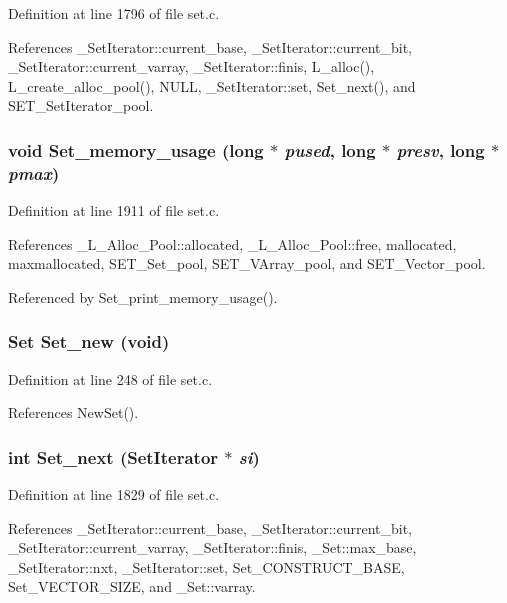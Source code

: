 Definition at line 1796 of file set.c.

References \_\-Set\-Iterator::current\_\-base, \_\-Set\-Iterator::current\_\-bit, \_\-Set\-Iterator::current\_\-varray, \_\-Set\-Iterator::finis, L\_\-alloc(), L\_\-create\_\-alloc\_\-pool(), NULL, \_\-Set\-Iterator::set, Set\_\-next(), and SET\_\-Set\-Iterator\_\-pool.
\subsubsection{\setlength{\rightskip}{0pt plus 5cm}void Set\_\-memory\_\-usage (long $\ast$ {\em pused}, long $\ast$ {\em presv}, long $\ast$ {\em pmax})}\label{set_8h_f08a75fa13869226e70109181551825b}




Definition at line 1911 of file set.c.

References \_\-L\_\-Alloc\_\-Pool::allocated, \_\-L\_\-Alloc\_\-Pool::free, mallocated, maxmallocated, SET\_\-Set\_\-pool, SET\_\-VArray\_\-pool, and SET\_\-Vector\_\-pool.

Referenced by Set\_\-print\_\-memory\_\-usage().
\subsubsection{\setlength{\rightskip}{0pt plus 5cm}\bf{Set} Set\_\-new (void)}\label{set_8h_e41d4e9316cf48def43503b5b653a343}




Definition at line 248 of file set.c.

References New\-Set().
\subsubsection{\setlength{\rightskip}{0pt plus 5cm}int Set\_\-next (\bf{Set\-Iterator} $\ast$ {\em si})}\label{set_8h_8927f07a262987755e10ac33bd385cec}




Definition at line 1829 of file set.c.

References \_\-Set\-Iterator::current\_\-base, \_\-Set\-Iterator::current\_\-bit, \_\-Set\-Iterator::current\_\-varray, \_\-Set\-Iterator::finis, \_\-Set::max\_\-base, \_\-Set\-Iterator::nxt, \_\-Set\-Iterator::set, Set\_\-CONSTRUCT\_\-BASE, Set\_\-VECTOR\_\-SIZE, and \_\-Set::varray.

